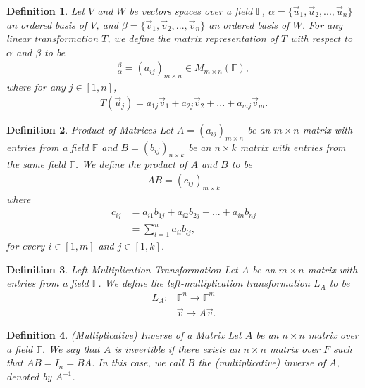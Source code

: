 \documentclass[12pt,answers]{exam}
\newcommand{\F}{\mathbb{F}}
\newtheorem{definition}{Definition}[section]
\begin{document}
\begin{definition}
Let $V$ and $W$ be vectors spaces over a field $\F$, $\alpha=\{\vec{u}_1,\vec{u}_{2},...,\vec{u}_n\}$ an ordered basis of $V$, and $\beta=\{\vec{v}_1,\vec{v}_{2},...,\vec{v}_n\}$ an ordered basis of $W$. For any linear transformation $T$, we define the matrix representation of $T$ with respect to $\alpha$ and $\beta$ to be
\begin{align*}
    [T]^{\beta}_{\alpha}=(a_{ij})_{m\times n}\in M_{m\times n}(\F),
\end{align*}
where for any $j\in [1,n]$,
\begin{align*}
    T(\vec{u}_{j})=a_{1j}\vec{v}_{1}+a_{2j}\vec{v}_{2}+...+a_{mj}\vec{v}_{m}.
\end{align*}
\end{definition}

\begin{definition}{Product of Matrices}
Let $A=(a_{ij})_{m\times n}$ be an $m\times n$ matrix with entries from a field $\F$ and $B=(b_{ij})_{n\times k}$ be an $n\times k$ matrix with entries from the same field $\F$. We define the product of $A$ and $B$ to be
\begin{align*}
    AB=(c_{ij})_{m\times k} 
\end{align*}
where 
\begin{align*}
    c_{ij}&=a_{i1}b_{1j}+a_{i2}b_{2j}+...+a_{in}b_{nj} \\
    &=\sum^{n}_{l=1} a_{il}b_{lj},
\end{align*}
for every $i\in [1,m]$ and $j\in[1,k]$.
\end{definition}

\begin{definition}{Left-Multiplication Transformation}
Let $A$ be an $m\times n$ matrix with entries from a field $\F$. We define the left-multiplication transformation $L_{A}$ to be
\begin{align*}
    L_{A}:& \F^{n}\rightarrow \F^{m} \\
    &\vec{v}\rightarrow A\vec{v}.
\end{align*}
\end{definition}

\begin{definition}{(Multiplicative) Inverse of a Matrix}
Let $A$ be an $n\times n$ matrix over a field $\F$. We say that $A$ is invertible if there exists an $n\times n$ matrix over $F$ such that $AB=I_{n}=BA$. In this case, we call $B$ the (multiplicative) inverse of $A$, denoted by $A^{-1}$.
\end{definition}
\end{document}
